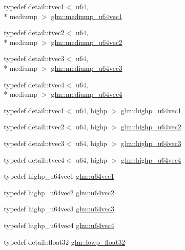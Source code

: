 \begin{DoxyCompactItemize}
\item 
typedef detail\-::tvec1$<$ u64, \\*
mediump $>$ \hyperlink{group__gtc__type__precision_gaf4211dc9e211d57b34b45a612b6de193}{glm\-::mediump\-\_\-u64vec1}
\item 
typedef detail\-::tvec2$<$ u64, \\*
mediump $>$ \hyperlink{group__gtc__type__precision_ga9eda8d6f5be7a2919fb90412535b385f}{glm\-::mediump\-\_\-u64vec2}
\item 
typedef detail\-::tvec3$<$ u64, \\*
mediump $>$ \hyperlink{group__gtc__type__precision_ga7af0601e6a8ce71bd21ecf67971f5154}{glm\-::mediump\-\_\-u64vec3}
\item 
typedef detail\-::tvec4$<$ u64, \\*
mediump $>$ \hyperlink{group__gtc__type__precision_gae25a6609fa377ba1ec983ec32a91f1d4}{glm\-::mediump\-\_\-u64vec4}
\item 
typedef detail\-::tvec1$<$ u64, highp $>$ \hyperlink{group__gtc__type__precision_gab48ca217e1d1cc9aac3d9f037493ae7e}{glm\-::highp\-\_\-u64vec1}
\item 
typedef detail\-::tvec2$<$ u64, highp $>$ \hyperlink{group__gtc__type__precision_gad11667a4764867732a89791ec2a01aeb}{glm\-::highp\-\_\-u64vec2}
\item 
typedef detail\-::tvec3$<$ u64, highp $>$ \hyperlink{group__gtc__type__precision_ga3cb5c038f8cba0dfb894af66b7b2ba13}{glm\-::highp\-\_\-u64vec3}
\item 
typedef detail\-::tvec4$<$ u64, highp $>$ \hyperlink{group__gtc__type__precision_ga8aa6fc9f16dfa3078d411f6361188a45}{glm\-::highp\-\_\-u64vec4}
\item 
typedef highp\-\_\-u64vec1 \hyperlink{group__gtc__type__precision_ga7d5145019ad749f4becd39ce8e786a5f}{glm\-::u64vec1}
\item 
typedef highp\-\_\-u64vec2 \hyperlink{group__gtc__type__precision_gaffa78d655fd98b33e47043e2bd38641b}{glm\-::u64vec2}
\item 
typedef highp\-\_\-u64vec3 \hyperlink{group__gtc__type__precision_gae934e74663d832989066cc852560866d}{glm\-::u64vec3}
\item 
typedef highp\-\_\-u64vec4 \hyperlink{group__gtc__type__precision_ga59d78a1ff6d275bbb425dce92f607b9c}{glm\-::u64vec4}
\item 
typedef detail\-::float32 \hyperlink{group__gtc__type__precision_ga92be8087f3c84504f3a44af1a9efc51e}{glm\-::lowp\-\_\-float32}
\item 

\end{DoxyCompactItemize}
